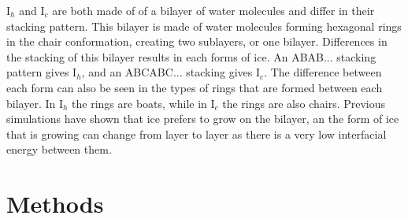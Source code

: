 \documentclass[titlepage]{article}
\begin{document}
\indent I$_{h}$ and I$_{c}$ are both made of of a bilayer of water molecules and differ in their stacking pattern.  This bilayer is made of water molecules forming hexagonal rings in the chair conformation, creating two sublayers, or one bilayer.  Differences in the stacking of this bilayer results in each forms of ice.  An ABAB... stacking pattern gives I$_{h}$, and an ABCABC... stacking gives I$_{c}$.  The difference between each form can also be seen in the types of rings that are formed between each bilayer.  In I$_{h}$ the rings are boats, while in I$_{c}$ the rings are also chairs\cite{BADH08}.  Previous simulations have shown that ice prefers to grow on the bilayer\cite{C07}, an the form of ice that is growing can change from layer to layer as there is a very low interfacial energy between them\cite{J98}.\\

\section{Methods}
\end{document}
